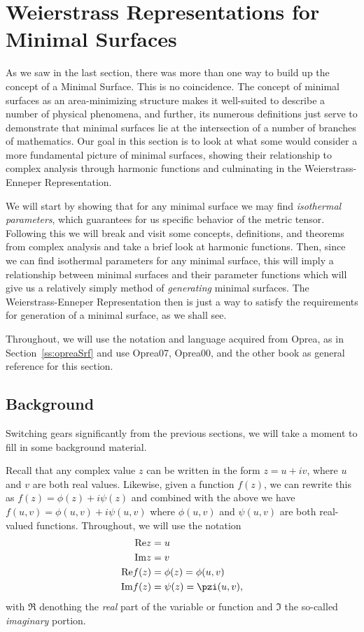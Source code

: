 \section{Weierstrass Representations for Minimal Surfaces}

  As we saw in the last section, there was more than one way to build up the concept of a Minimal Surface. This is no coincidence. The concept of minimal surfaces as an area-minimizing structure makes it well-suited to describe a number of physical phenomena, and further, its numerous definitions just serve to demonstrate that minimal surfaces lie at the intersection of a number of branches of mathematics. Our goal in this section is to look at what some would consider a more fundamental picture of minimal surfaces, showing their relationship to complex analysis through harmonic functions and culminating in the Weierstrass-Enneper Representation.

  We will start by showing that for any minimal surface we may find \emph{isothermal parameters}, which guarantees for us specific behavior of the metric tensor. Following this we will break and visit some concepts, definitions, and theorems from complex analysis and take a brief look at harmonic functions. Then, since we can find isothermal parameters for any minimal surface, this will imply a relationship between minimal surfaces and their parameter functions which will give us a relatively simply method of \emph{generating} minimal surfaces. The Weierstrass-Enneper Representation then is just a way to satisfy the requirements for generation of a minimal surface, as we shall see.

  Throughout, we will use the notation and language acquired from Oprea, as in Section~\ref{ss:opreaSrf} and use Oprea07, Oprea00, and the other book as general reference for this section.

\subsection{Background}
  Switching gears significantly from the previous sections, we will take a moment to fill in some background material.

  Recall that any complex value $z$ can be written in the form $z = u + iv$, where $u$ and $v$ are both real values. Likewise, given a function $f(z)$, we can rewrite this as $f(z) = \phi(z) + i\psi(z)$ and combined with the above we have $f(u, v) = \phi(u, v) + i \psi(u, v)$ where $\phi(u, v)$ and $\psi(u, v)$ are both real-valued functions. Throughout, we will use the notation
  \begin{align*}
    \Re z &= u\\
    \Im z &= v\\
    \Re f(z) &= \phi(z) = \phi(u, v)\\
    \Im f(z) &= \psi(z) = \pzi(u, v) , 
  \end{align*}
  with $\Re$ denothing the \emph{real} part of the variable or function and $\Im$ the so-called \emph{imaginary} portion.

